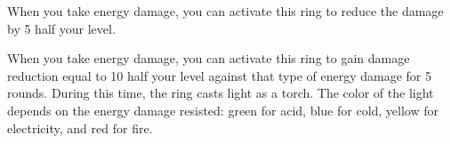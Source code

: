 \begin{comment}
\begin{dtable}
\lcaption{Rings}
\begin{tabularx}{\columnwidth}{>{\lcol}X l}
Ring & Market Price \\
Protection \plus1 & 2,000 gp \\
Feather falling & 2,200 gp \\
Climbing & 2,500 gp \\
Jumping & 2,500 gp \\
Sustenance & 2,500 gp \\
Swimming & 2,500 gp \\
Mind shielding & 8,000 gp \\
Protection \plus2 & 8,000 gp \\
Climbing, improved & 10,000 gp \\
Jumping, improved & 10,000 gp \\
Swimming, improved & 10,000 gp \\
Energy resistance, minor & 12,000 gp \\
Protection \plus3 & 18,000 gp \\
Energy resistance, major & 28,000 gp \\
Protection \plus4 & 32,000 gp \\
Energy resistance, greater & 44,000 gp \\
Protection \plus5 & 50,000 gp \\
\end{tabularx}
\end{dtable}
\end{comment}

 When you take energy damage, you can activate this ring to reduce the damage by 5 \add half your level.


 When you take energy damage, you can activate this ring to gain damage reduction equal to 10 \add half your level against that type of energy damage for 5 rounds. During this time, the ring casts light as a torch. The color of the light depends on the energy damage resisted: green for acid, blue for cold, yellow for electricity, and red for fire.


